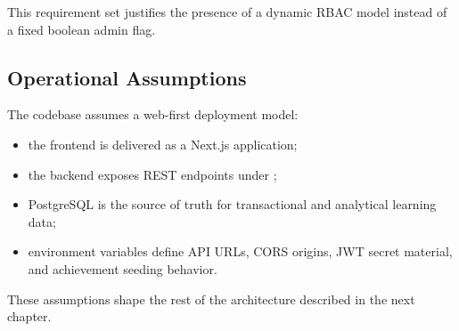 This requirement set justifies the presence of a dynamic RBAC model instead of a fixed boolean admin flag.

\subsection{Operational Assumptions}

The codebase assumes a web-first deployment model:
\begin{itemize}
  \item the frontend is delivered as a Next.js application;
  \item the backend exposes REST endpoints under ;
  \item PostgreSQL is the source of truth for transactional and analytical learning data;
  \item environment variables define API URLs, CORS origins, JWT secret material, and achievement seeding behavior.
\end{itemize}

These assumptions shape the rest of the architecture described in the next chapter.

